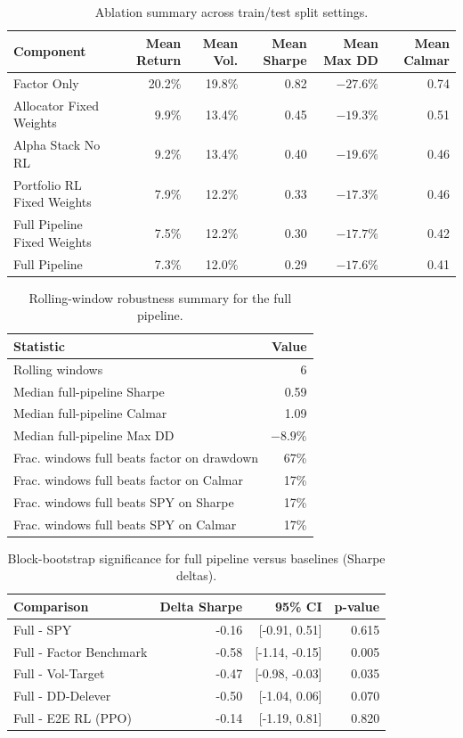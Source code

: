 \begin{table}[H]
\centering
\caption{Ablation summary across train/test split settings.}
\label{tab:ablation_summary}
\begin{tabular}{@{} l r r r r r @{}}
\toprule
Component & Mean Return & Mean Vol. & Mean Sharpe & Mean Max DD & Mean Calmar \\
\midrule
Factor Only & 20.2\% & 19.8\% & 0.82 & $-27.6\%$ & 0.74 \\
Allocator Fixed Weights & 9.9\% & 13.4\% & 0.45 & $-19.3\%$ & 0.51 \\
Alpha Stack No RL & 9.2\% & 13.4\% & 0.40 & $-19.6\%$ & 0.46 \\
Portfolio RL Fixed Weights & 7.9\% & 12.2\% & 0.33 & $-17.3\%$ & 0.46 \\
Full Pipeline Fixed Weights & 7.5\% & 12.2\% & 0.30 & $-17.7\%$ & 0.42 \\
Full Pipeline & 7.3\% & 12.0\% & 0.29 & $-17.6\%$ & 0.41 \\
\bottomrule
\end{tabular}
\end{table}

\begin{table}[H]
\centering
\caption{Rolling-window robustness summary for the full pipeline.}
\label{tab:robustness_summary}
\begin{tabular}{@{} l r @{}}
\toprule
Statistic & Value \\
\midrule
Rolling windows & 6 \\
Median full-pipeline Sharpe & 0.59 \\
Median full-pipeline Calmar & 1.09 \\
Median full-pipeline Max DD & $-8.9\%$ \\
Frac. windows full beats factor on drawdown & 67\% \\
Frac. windows full beats factor on Calmar & 17\% \\
Frac. windows full beats SPY on Sharpe & 17\% \\
Frac. windows full beats SPY on Calmar & 17\% \\
\bottomrule
\end{tabular}
\end{table}

\begin{table}[H]
\centering
\caption{Block-bootstrap significance for full pipeline versus baselines (Sharpe deltas).}
\label{tab:bootstrap_significance}
\begin{tabular}{@{} l r r r @{}}
\toprule
Comparison & Delta Sharpe & 95\% CI & p-value \\
\midrule
Full - SPY & -0.16 & [-0.91, 0.51] & 0.615 \\
Full - Factor Benchmark & -0.58 & [-1.14, -0.15] & 0.005 \\
Full - Vol-Target & -0.47 & [-0.98, -0.03] & 0.035 \\
Full - DD-Delever & -0.50 & [-1.04, 0.06] & 0.070 \\
Full - E2E RL (PPO) & -0.14 & [-1.19, 0.81] & 0.820 \\
\bottomrule
\end{tabular}
\end{table}

